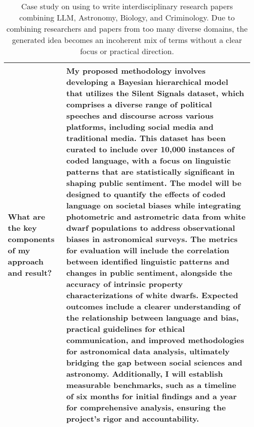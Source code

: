 \begin{table*}[htbp]
\begin{tabular}{p{3.5cm}p{12cm}}
What are the key components of my approach and result? & 
My proposed methodology involves developing a Bayesian hierarchical model that utilizes the Silent Signals dataset, which comprises a diverse range of political speeches and discourse across various platforms, including social media and traditional media. This dataset has been curated to include over 10,000 instances of coded language, with a focus on linguistic patterns that are statistically significant in shaping public sentiment. The model will be designed to quantify the effects of coded language on societal biases while integrating photometric and astrometric data from white dwarf populations to address observational biases in astronomical surveys. The metrics for evaluation will include the correlation between identified linguistic patterns and changes in public sentiment, alongside the accuracy of intrinsic property characterizations of white dwarfs. Expected outcomes include a clearer understanding of the relationship between language and bias, practical guidelines for ethical communication, and improved methodologies for astronomical data analysis, ultimately bridging the gap between social sciences and astronomy. Additionally, I will establish measurable benchmarks, such as a timeline of six months for initial findings and a year for comprehensive analysis, ensuring the project's rigor and accountability.\\ 
\bottomrule[1.1pt]
\end{tabular}
\caption{Case study on using \envname to write interdisciplinary research papers combining LLM, Astronomy, Biology, and Criminology. Due to combining researchers and papers from too many diverse domains, the generated idea becomes an incoherent mix of terms without a clear focus or practical direction.}
\label{tab:LLM+Astronomy+Biology+Criminology }
\end{table*}


